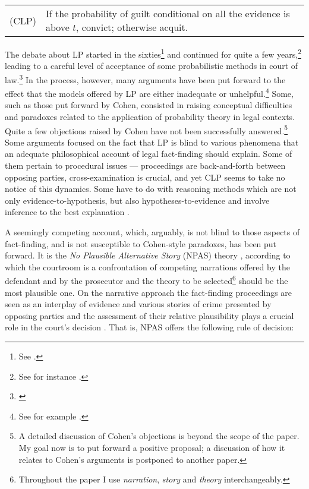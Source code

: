 \documentclass[10pt,leqno]{article}
\begin{document}
 
 \begin{center}
\begin{tabular}{lp{7.5cm}}
{(CLP)} &If the probability of guilt conditional on all the evidence is above $t$, convict; otherwise acquit.\end{tabular}
 \end{center}

The debate about LP started in the sixties\footnote{See   \citep{ball1960moment,kaplan1968decision,cullison1969probability,simon1970quantifying,lempert1977modeling,kaye1979paradox}.}   
and continued for quite a few years,\footnote{See for instance \citep{tillers1988probability}.} leading to a careful level of acceptance of some probabilistic methods in court of law.\footnote{\citep{Stein2005Foundations-of-,ho2008philosophy,aitken2010fundamentals}} In the process, however, many arguments have been put forward to the effect that the models offered by LP are either inadequate or unhelpful.\footnote{See for example \citep{tribe1970further,tribe1971trial,Cohen1977The-probable-an,Underwood1977The-thumb-on-th,Nesson1979Reasonable-doub,cohen1981subjective,dant1988gambling,wells1992naked,Stein2005Foundations-of-,allen2007problematic,ho2008philosophy,haack2011legal}.} Some, such as those put forward by Cohen, consisted in raising conceptual difficulties and paradoxes related to  the application of probability theory in legal contexts. Quite a few objections raised by Cohen have not been successfully answered.\footnote{A detailed discussion of Cohen's objections is beyond the scope of the paper. My goal now is to put forward a positive proposal; a discussion of how it relates to Cohen's arguments is postponed to another paper.} Some arguments focused on the fact that LP is blind  to various phenomena that an adequate philosophical  account of legal fact-finding should explain. Some of them pertain to   procedural issues \citep{Stein2005Foundations-of-} --- proceedings are back-and-forth between opposing parties, cross-examination is crucial, and yet CLP seems to take no notice of this dynamics. Some have to do with reasoning methods which are not only evidence-to-hypothesis, but also hypotheses-to-evidence \citep{wells1992naked,allen2007problematic}  and involve  inference to the best explanation \citep{dant1988gambling}. 

A seemingly competing account, which, arguably, is not blind to those aspects of fact-finding, and is not susceptible to Cohen-style paradoxes, has been put forward.   It is the \emph{No Plausible Alternative Story} (NPAS) theory \citep{allen2010no}, according to which  the courtroom is a confrontation of competing narrations offered by the defendant and by the prosecutor and  the theory to be selected\footnote{Throughout the paper I use \emph{narration}, \emph{story} and \emph{theory} interchangeably.} should be the most plausible one. On the narrative approach
 the fact-finding proceedings are seen as  an interplay of evidence and various stories of crime presented by opposing parties and the assessment of their  relative plausibility plays a crucial role in the court's decision \citep{ho2008philosophy}. That is, NPAS   offers the following rule of decision: 
\end{document}
